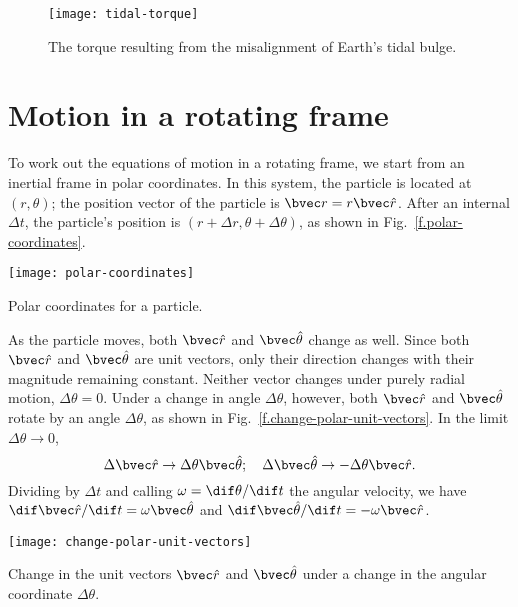 \begin{figure*}
\texttt{[image: tidal-torque]}
\caption[Torque on the Earth's tidal bulge]{The torque resulting from the misalignment of Earth's tidal bulge.
\label{f.tidal-torque}}
\end{figure*}

\section{Motion in a rotating frame}

To work out the equations of motion in a rotating frame, we start from an inertial frame in polar coordinates.  In this system, the particle is located at $(r,\theta)$; the position vector of the particle is $\rv = r\rhat$. After an internal $\Delta t$, the particle's position is $(r+\Delta r,\theta+\Delta\theta)$, as shown in Fig.~\ref{f.polar-coordinates}.  

\begin{marginfigure}[\baselineskip]
\texttt{[image: polar-coordinates]}
\caption[Polar coordinates]{Polar coordinates for a particle.
\label{f.polar-coordinates}}
\end{marginfigure}

As the particle moves, both $\rhat$ and $\thetahat$ change as well.  Since both $\rhat$ and $\thetahat$ are unit vectors, only their direction changes with their magnitude remaining constant. Neither vector changes under purely radial motion, $\Delta\theta = 0$.  Under a change in angle $\Delta\theta$, however, both $\rhat$ and $\thetahat$ rotate by an angle $\Delta\theta$, as shown in Fig.~\ref{f.change-polar-unit-vectors}. In the limit $\Delta\theta \to 0$, 
\[ \Delta \rhat \to \Delta\theta \thetahat; \quad \Delta\thetahat \to -\Delta\theta\rhat. \]
Dividing by $\Delta t$ and calling $\omega = \dif\theta/\dif t$ the angular velocity, we have
$\dif\rhat/\dif t = \omega\thetahat$ and $\dif\thetahat/\dif t = -\omega\rhat$.

\begin{marginfigure}[4\baselineskip]
\texttt{[image: change-polar-unit-vectors]}
\caption[Change in unit vectors under rotation]{Change in the unit vectors $\rhat$ and $\thetahat$ under a change in the angular coordinate $\Delta\theta$.
\label{f.change-polar-unit-vectors}}
\end{marginfigure}

